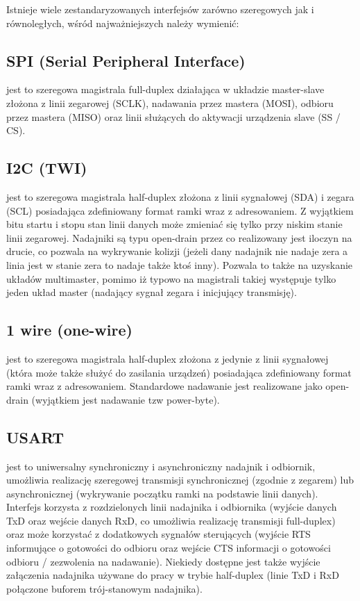Istnieje wiele zestandaryzowanych interfejsów zarówno szeregowych jak i równoległych, wśród najważniejszych należy wymienić:

\subsection{SPI (Serial Peripheral Interface)}
    jest to szeregowa magistrala full-duplex działająca w układzie master-slave złożona z linii zegarowej (SCLK), nadawania przez mastera (MOSI), odbioru przez mastera (MISO) oraz linii służących do aktywacji urządzenia slave (SS / CS). 
\subsection{I2C (TWI)}
    jest to szeregowa magistrala half-duplex złożona z linii sygnałowej (SDA) i zegara (SCL) posiadająca zdefiniowany format ramki wraz z adresowaniem. Z wyjątkiem bitu startu i stopu stan linii danych może zmieniać się tylko przy niskim stanie linii zegarowej.
    Nadajniki są typu open-drain przez co realizowany jest iloczyn na drucie, co pozwala na wykrywanie kolizji (jeżeli dany nadajnik nie nadaje zera a linia jest w stanie zera to nadaje także ktoś inny). Pozwala to także na uzyskanie układów multimaster, pomimo iż typowo na magistrali takiej występuje tylko jeden układ master (nadający sygnał zegara i inicjujący transmisję). 
\subsection{1 wire (one-wire)}
    jest to szeregowa magistrala half-duplex złożona z jedynie z linii sygnałowej (która może także służyć do zasilania urządzeń) posiadająca zdefiniowany format ramki wraz z adresowaniem. Standardowe nadawanie jest realizowane jako open-drain (wyjątkiem jest nadawanie tzw power-byte). 
\subsection{USART}
    jest to uniwersalny synchroniczny i asynchroniczny nadajnik i odbiornik, umożliwia realizację szeregowej transmisji synchronicznej (zgodnie z zegarem) lub asynchronicznej (wykrywanie początku ramki na podstawie linii danych). Interfejs korzysta z rozdzielonych linii nadajnika i odbiornika (wyjście danych TxD oraz wejście danych RxD, co umożliwia realizację transmisji full-duplex) oraz może korzystać z dodatkowych sygnałów sterujących (wyjście RTS informujące o gotowości do odbioru oraz wejście CTS informacji o gotowości odbioru / zezwolenia na nadawanie). Niekiedy dostępne jest także wyjście załączenia nadajnika używane do pracy w trybie half-duplex (linie TxD i RxD połączone buforem trój-stanowym nadajnika).

